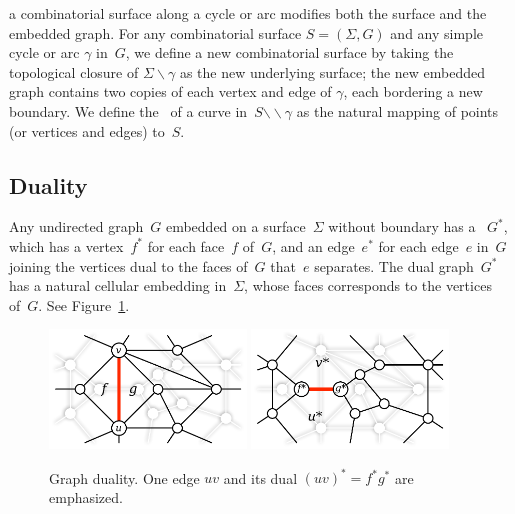 \documentclass[11pt,twoside]{article}
\def\snip{\mathbin{\raisebox{0.15ex}{\rotatebox[origin=c]{60}{\Rightscissors}\!}}}
\def\snip{\mathbin{\backslash\!\!\backslash}}
\begin{document}
 a combinatorial surface along a cycle or arc modifies both the surface and the embedded graph.
For any combinatorial surface $S = (\Sigma, G)$ and any simple cycle or arc $\gamma$ in~$G$, we define a new combinatorial surface \EMPH{$S \snip \gamma$} by taking the topological closure of $\Sigma \backslash \gamma$ as the new underlying surface; the new embedded graph contains two copies of each vertex and edge of $\gamma$, each bordering a new boundary.
We define the~ of a curve in~$S \snip \gamma$ as the natural mapping of points (or vertices and edges) to~$S$. 


\subsection{Duality}


Any undirected graph~$G$ embedded on a surface~$\Sigma$ without boundary has a
~$G^*$, which has a vertex~$f^*$ for each face~$f$ of~$G$,
and an edge~$e^*$ for each edge~$e$ in~$G$ joining the vertices dual to the
faces of~$G$ that~$e$ separates. The dual graph~$G^*$ has a natural cellular
embedding in~$\Sigma$, whose faces corresponds to the vertices of~$G$.
See Figure~\ref{fig:prelims_primaldual}.


\begin{figure}[ht]
\centering
\includegraphics[height=1.25in]{Fig/primal}\quad
\includegraphics[height=1.25in]{Fig/dual}
\caption{Graph duality.  One edge $uv$ and its dual $(uv)^* =
f^*g^*$ are emphasized.} \label{fig:prelims_primaldual}
\end{figure}
\end{document}
